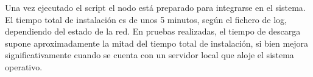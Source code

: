 \documentclass{article}
\begin{document}
Una vez ejecutado el script el nodo está preparado para integrarse en el sistema. El tiempo total de instalación es de unos 5 minutos, según el fichero de log, dependiendo del estado de la red. En pruebas realizadas, el tiempo de descarga supone aproximadamente la mitad del tiempo total de instalación, si bien mejora significativamente cuando se cuenta con un servidor local que aloje el sistema operativo.

\nocite{rpiconfig}

 \label{Bibliography}
\end{document}
